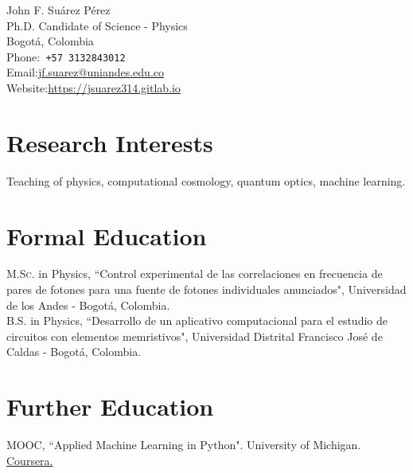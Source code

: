 \documentclass[10pt, a4paper]{article}
\newcommand{\years}[1]{\marginnote{\scriptsize #1}}
\begin{document}
{\LARGE John F. Suárez Pérez}\\[1cm]
Ph.D. Candidate of Science - Physics \\
Bogotá, Colombia\\[.2cm]
Phone:\hspace{0.2cm}\texttt{ +57 3132843012 }\\
Email:\hspace{0.5cm}\href{mailto:jf.suarez@uniandes.edu.co}{jf.suarez@uniandes.edu.co}\\
Website:\hspace{0.16cm}\href{https://jsuarez314.gitlab.io}{https://jsuarez314.gitlab.io}


\section*{Research Interests}
 Teaching of physics, computational cosmology, quantum optics, machine learning.

\section*{Formal Education}
\noindent
\years{2018}\textsc{M.Sc.} in Physics, “Control experimental de las correlaciones en frecuencia de pares de fotones para una fuente de fotones individuales anunciados", Universidad de los Andes - Bogotá, Colombia.\\

\years{2014}\textsc{B.S.} in Physics, “Desarrollo de un aplicativo computacional para el estudio de circuitos con elementos memristivos", Universidad Distrital Francisco José de Caldas - Bogotá, Colombia.\\


\section*{Further Education}
\noindent
\years{2020}\textsc{MOOC}, “Applied Machine Learning in Python". University of Michigan. \href{https://coursera.org/share/620fe326f4cc26b1f4a9bf77690114ae}{Coursera.}\\
\end{document}
